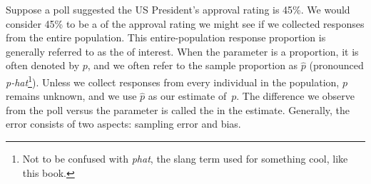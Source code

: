 Suppose a poll suggested the US President's approval
rating is 45\%.
We would consider 45\% to be a
 of the approval
rating we might see if we collected responses from the
entire population.
This entire-population response proportion is
generally referred to as the 
of interest.
When the parameter is a proportion,
it is often denoted by $p$,
and we often refer to the sample proportion as $\hat{p}$
(pronounced \emph{p-hat}\footnote{Not to be confused with
  \emph{phat}, the slang term used for something cool,
  like this book.}).
Unless we collect responses from every individual in the population,
$p$ remains unknown, and we use $\hat{p}$ as our estimate of~$p$.
The difference we observe from the poll versus
the parameter is called the  in the estimate.
Generally, the error consists of two aspects:
sampling error and bias.


%
%

